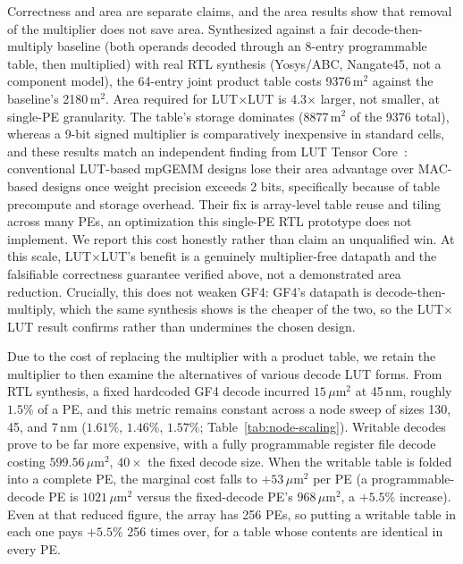 Correctness and area are separate claims, and the area results show that removal
of the multiplier does not save area. Synthesized against a fair
decode-then-multiply baseline (both operands decoded through an 8-entry
programmable table, then multiplied) with real RTL synthesis (Yosys/ABC,
Nangate45, not a component model), the 64-entry joint product table costs
9376\,\textmu m$^2$ against the baseline's 2180\,\textmu m$^2$. Area required for
LUT$\times$LUT is 4.3$\times$ larger, not smaller, at single-PE granularity. The
table's storage dominates (8877\,\textmu m$^2$ of the 9376 total), whereas a
9-bit signed multiplier is comparatively inexpensive in standard cells, and these
results match an independent finding from LUT Tensor Core~\cite{mo2025lut}:
conventional LUT-based mpGEMM designs lose their area advantage over MAC-based
designs once weight precision exceeds 2 bits, specifically because of table
precompute and storage overhead. Their fix is array-level table reuse and tiling
across many PEs, an optimization this single-PE RTL prototype does not implement.
We report this cost honestly rather than claim an unqualified win. At this scale,
LUT$\times$LUT's benefit is a genuinely multiplier-free datapath and the
falsifiable correctness guarantee verified above, not a demonstrated area
reduction. Crucially, this does not weaken GF4: GF4's datapath is
decode-then-multiply, which the same synthesis shows is the cheaper of the two,
so the LUT$\times$LUT result confirms rather than undermines the chosen design.

Due to the cost of replacing the multiplier with a product table, we retain the
multiplier to then examine the alternatives of various decode LUT forms. From RTL
synthesis, a fixed hardcoded GF4 decode incurred $15\,\mu\text{m}^2$ at 45\,nm,
roughly $1.5\%$ of a PE, and this metric remains constant across a node sweep of
sizes 130, 45, and 7\,nm ($1.61\%$, $1.46\%$, $1.57\%$; Table~\ref{tab:node-scaling}).
Writable decodes prove to be far more expensive, with a fully programmable
register file decode costing $599.56\,\mu\text{m}^2$, $40\times$ the fixed decode
size. When the writable table is folded into a complete PE, the marginal cost
falls to $+53\,\mu\text{m}^2$ per PE (a programmable-decode PE is
$1021\,\mu\text{m}^2$ versus the fixed-decode PE's $968\,\mu\text{m}^2$, a
$+5.5\%$ increase). Even at that reduced figure, the array has 256 PEs, so putting
a writable table in each one pays $+5.5\%$ 256 times over, for a table whose
contents are identical in every PE.

